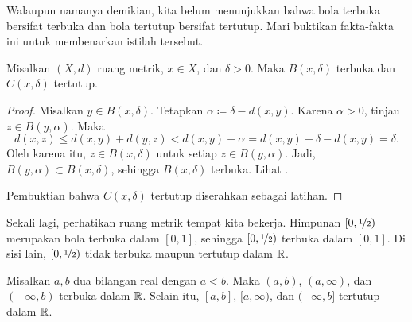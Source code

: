 Walaupun namanya demikian,
kita belum menunjukkan bahwa bola terbuka bersifat terbuka dan bola tertutup bersifat
tertutup.  Mari buktikan fakta-fakta ini untuk membenarkan istilah tersebut.

\begin{prop} \label{prop:topology:ballsopenclosed}
Misalkan $(X,d)$ ruang metrik, $x \in X$, dan $\delta > 0$.  Maka
$B(x,\delta)$ terbuka dan
$C(x,\delta)$ tertutup.
\end{prop}

\begin{proof}
Misalkan $y \in B(x,\delta)$.  Tetapkan $\alpha \coloneqq \delta-d(x,y)$.  Karena $\alpha
> 0$, tinjau $z \in B(y,\alpha)$.  Maka
\begin{equation*}
d(x,z) \leq d(x,y) + d(y,z) < d(x,y) + \alpha = d(x,y) + \delta-d(x,y) =
\delta .
\end{equation*}
Oleh karena itu, $z \in B(x,\delta)$ untuk setiap $z \in B(y,\alpha)$.  Jadi,
$B(y,\alpha) \subset B(x,\delta)$, sehingga
$B(x,\delta)$ terbuka.  Lihat .

\begin{myfigureht}
\caption{Bukti bahwa $B(x,\delta)$ terbuka: $B(y,\alpha) \subset
B(x,\delta)$ dengan ilustrasi ketaksamaan segitiga.\label{fig:ballisopen}}
\end{myfigureht}

Pembuktian bahwa $C(x,\delta)$ tertutup diserahkan sebagai latihan.
\end{proof}

Sekali lagi, perhatikan ruang metrik tempat kita bekerja.
Himpunan $[0,\nicefrac{1}{2})$ merupakan
bola terbuka dalam $[0,1]$, sehingga $[0,\nicefrac{1}{2})$
terbuka dalam $[0,1]$.  Di sisi lain, $[0,\nicefrac{1}{2})$
tidak terbuka maupun tertutup dalam ${\mathbb{R}}$.

\begin{prop} \label{prop:topology:intervals:openclosed}
Misalkan $a, b$ dua bilangan real dengan $a < b$.  Maka $(a,b)$, $(a,\infty)$,
dan $(-\infty,b)$ terbuka dalam ${\mathbb{R}}$.
Selain itu, $[a,b]$, $[a,\infty)$,
dan $(-\infty,b]$ tertutup dalam ${\mathbb{R}}$.
\end{prop}

